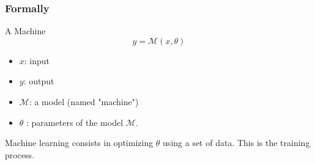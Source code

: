 \documentclass[handout, 10pt]{beamer}
\begin{document}
\begin{frame}
\frametitle{Formally}
\begin{block}{A Machine}
\begin{equation*}
y = \mathcal{M}(x,\theta)
\end{equation*}
\begin{itemize}
\item $x$: input
\item $y$: output
\item $\mathcal{M}$: a model (named "machine")
\item $\theta$ : parameters of the model $\mathcal{M}$.
\end{itemize}
\end{block}
\alert{Machine learning} consists in optimizing $\theta$ using a set of data. 
This is the training process.
\end{frame}
\end{document}
